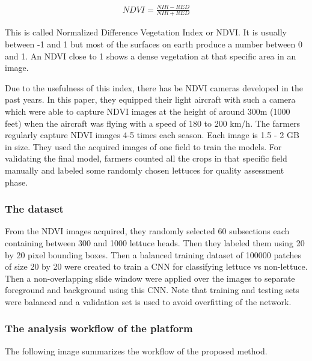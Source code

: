 \documentclass{article}
\begin{document}
\begin{eqnarray*}
	NDVI = \frac{NIR - RED}{NIR + RED}
\end{eqnarray*}

This is called Normalized Difference Vegetation Index or NDVI. It is usually between -1 and 1 but most of the surfaces on earth produce a number between 0 and 1. An NDVI close to 1 shows a dense vegetation at that specific area in an image. 

Due to the usefulness of this index, there has be NDVI cameras developed in the past years. In this paper, they equipped their light aircraft with such a camera which were able to capture NDVI images at the height of around 300m (1000 feet) when the aircraft was flying with a speed of 180 to 200 km/h. The farmers regularly capture NDVI images 4-5 times each season. Each image is 1.5 - 2 GB in size. They used the acquired images of one field to train the models. For validating the final model, farmers counted all the crops in that specific field manually and labeled some randomly chosen lettuces for quality assessment phase. 

\subsubsection{The dataset}

From the NDVI images acquired, they randomly selected 60 subsections each containing between 300 and 1000 lettuce heads. Then they labeled them using 20 by 20 pixel bounding boxes. Then a balanced training dataset of 100000 patches of size 20 by 20 were created to train a CNN for classifying lettuce vs non-lettuce. Then a non-overlapping slide window were applied over the images to separate foreground and background using this CNN. Note that training and testing sets were balanced and a validation set is used to avoid overfitting of the network. 

\subsubsection{The analysis workflow of the platform}

The following image summarizes the workflow of the proposed method. 
\end{document}
